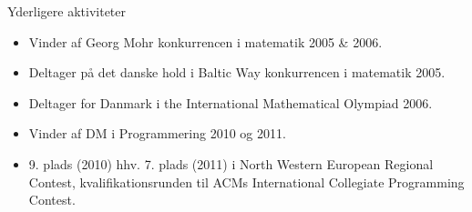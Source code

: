 \documentclass[11pt,oneside,a4paper]{article}
\newenvironment{ressection}[1]{
	\vspace{4pt}
	{\fontfamily{phv}\selectfont\Large#1}
	\begin{itemize}
	\vspace{3pt}
}{
	\end{itemize}
}
\newcommand{\resitem}[1]{
	\vspace{-4pt}
	\item \begin{flushleft} #1 \end{flushleft}
}
\begin{document}

\begin{ressection}{Yderligere aktiviteter}

	\resitem{Vinder af Georg Mohr konkurrencen i matematik 2005 \& 2006.}
	
	\resitem{Deltager på det danske hold i Baltic Way konkurrencen i matematik 2005.}
	
	\resitem{Deltager for Danmark i the International Mathematical Olympiad 2006.}

    \resitem{Vinder af DM i Programmering 2010 og 2011.}

    \resitem{9. plads (2010) hhv. 7. plads (2011) i North Western European Regional Contest,
             kvalifikationsrunden til ACMs International Collegiate Programming Contest.}

\end{ressection}
\end{document}
